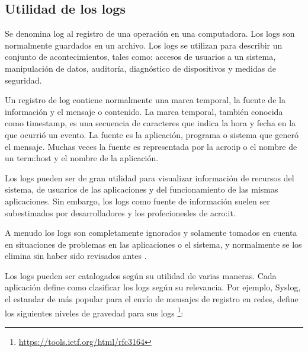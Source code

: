\subsection{Utilidad de los logs}
\label{utilidad-de-los-logs}

Se denomina log al registro de una operación en una computadora. Los logs son
normalmente guardados en un archivo. Los logs se utilizan para describir un
conjunto de acontecimientos, tales como: accesos de usuarios a un sistema,
manipulación de datos, auditoría, diagnóstico de dispositivos y medidas de
seguridad.

Un registro de log contiene normalmente una marca temporal, la fuente de la
información y el mensaje o contenido. La marca temporal, también conocida como
timestamp, es una secuencia de caracteres que indica la hora y fecha en la que
ocurrió un evento. La fuente es la aplicación, programa o sistema que generó el
mensaje. Muchas veces la fuente es representada por la \gls{acro:ip} o el
nombre de un \gls{term:host} y el nombre de la aplicación.

Los logs pueden ser de gran utilidad para visualizar información de recursos
del sistema, de usuarios de las aplicaciones y del funcionamiento de las mismas
aplicaciones. Sin embargo, los logs como fuente de información suelen ser
subestimados por desarrolladores y los profecionesles de \gls{acro:it}.

A menudo los logs son completamente ignorados y solamente tomados en cuenta en
situaciones de problemas en las aplicaciones o el sistema, y normalmente se los
elimina sin haber sido revisados antes
\cite[p.~16]{monitoreo:logging_and_log_management}.

Los logs pueden ser catalogados según su utilidad de varias maneras. Cada
aplicación define como clasificar los logs según su relevancia. Por ejemplo,
Syslog, el estandar de más popular para el envío de mensajes de registro en
redes, define los siguientes niveles de gravedad para sus logs
\footnote{\url{https://tools.ietf.org/html/rfc3164}}:

